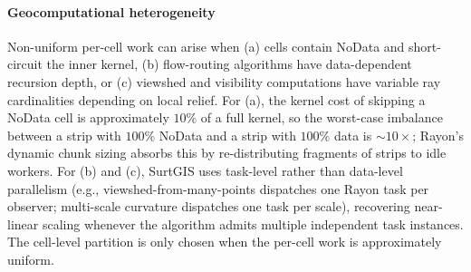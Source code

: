 \documentclass[preprint,review,12pt,authoryear]{elsarticle}
\begin{document}
\paragraph{Geocomputational heterogeneity} Non-uniform per-cell work can arise when (a) cells contain NoData and short-circuit the inner kernel, (b) flow-routing algorithms have data-dependent recursion depth, or (c) viewshed and visibility computations have variable ray cardinalities depending on local relief. For (a), the kernel cost of skipping a NoData cell is approximately $10\%$ of a full kernel, so the worst-case imbalance between a strip with $100\%$ NoData and a strip with $100\%$ data is $\sim 10\times$; Rayon's dynamic chunk sizing absorbs this by re-distributing fragments of strips to idle workers. For (b) and (c), SurtGIS uses task-level rather than data-level parallelism (e.g., viewshed-from-many-points dispatches one Rayon task per observer; multi-scale curvature dispatches one task per scale), recovering near-linear scaling whenever the algorithm admits multiple independent task instances. The cell-level partition is only chosen when the per-cell work is approximately uniform.
\end{document}
